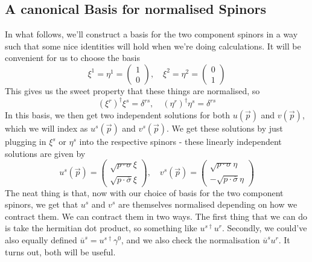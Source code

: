 \subsection{A canonical Basis for normalised Spinors} 
In what follows, we'll construct a basis 
for the two component spinors in a way such that 
some nice identities will hold when we're doing calculations. 
It will be convenient for us to choose the basis 
\[
	\xi ^ 1  = \eta ^ 1 = \begin{pmatrix}  1\\ 0  \end{pmatrix} , 
	\quad \xi ^ 2 = \eta ^ 2 = \begin{pmatrix}  0 \\ 1  \end{pmatrix} 
\] This gives us the sweet property that these 
things are normalised, so 
\[
 ( \xi ^ r ) ^ \dagger \xi ^  s =  \delta ^{ r s }, \quad 
 ( \eta ^ r ) ^ \dagger \eta ^ s = \delta ^{ r s }
\] In this basis, we then get 
two independent solutions for both $ u(\vec{p} ) $ 
and $ v ( \vec{p} ) $, which 
we will index as $ u ^ s ( \vec{p} ) $ and $ v ^ s ( \vec{p}  ) $. 
We get these solutions by just plugging in $ \xi ^ s $ or $ \eta ^ s $
into the respective spinors -  these linearly independent solutions are given by 
\[
	u ^ s (\vec{p} )  = \begin{pmatrix}  
	\sqrt{ p \cdot  \sigma }  \xi \\ \sqrt{ p \cdot  \overline{ \sigma } }  
\xi \end{pmatrix}, \quad v ^s ( \vec{p} ) = \begin{pmatrix}  
\sqrt{ p \cdot  \sigma }  \eta \\  - \sqrt{ p \cdot  \overline{\sigma}}  \eta \end{pmatrix}
\]  The neat thing is that, now with our 
choice of basis for the two component spinors, 
we get that $ u ^ s $ and $ v ^ s $ are themselves 
normalised depending on how we contract them. 
We can contract them in two ways. 
The first thing that we can do is take the hermitian 
dot product, so something like $ u^{ s \dagger  } u ^ r $. 
Secondly, we could've also equally defined $ \overline{ u } ^ s  = u^{ s \dagger } \gamma ^ 0 $, and we also check the normalisation 
$ \overline{ u } ^ s u ^ r $. It turns out, both 
will be useful. 


